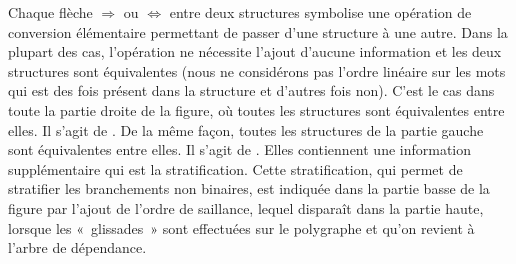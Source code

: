 Chaque flèche $\Rightarrow$ ou $\Leftrightarrow$ entre deux structures symbolise une opération de conversion élémentaire permettant de passer d’une structure à une autre. Dans la plupart des cas, l’opération ne nécessite l’ajout d’aucune information et les deux structures sont équivalentes (nous ne considérons pas l’ordre linéaire sur les mots qui est des fois présent dans la structure et d’autres fois non). C’est le cas dans toute la partie droite de la figure, où toutes les structures sont équivalentes entre elles. Il s'agit de . De la même façon, toutes les structures de la partie gauche sont équivalentes entre elles. Il s'agit de . Elles contiennent une information supplémentaire qui est la stratification. Cette stratification, qui permet de stratifier les branchements non binaires, est indiquée dans la partie basse de la figure par l’ajout de l’ordre de saillance, lequel disparaît dans la partie haute, lorsque les «~glissades~» sont effectuées sur le polygraphe et qu’on revient à l’arbre de dépendance.

